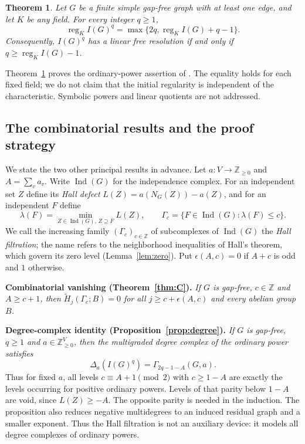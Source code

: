 \documentclass[11pt,a4paper]{article}
\newtheorem{theorem}{Theorem}
\theoremstyle{definition}
\newcommand{\reg}{\operatorname{reg}}
\newcommand{\Ind}{\operatorname{Ind}}
\newcommand{\Ht}{\widetilde H}
\newcommand{\ZZ}{\mathbb Z}
\newcommand{\NN}{\mathbb Z_{\geq 0}}
\begin{document}
\begin{theorem}\label{thm:main}
Let $G$ be a finite simple gap-free graph with at least one edge, and let $K$ be any field. For every integer $q\geq1$,
\begin{equation}\label{eq:main}
 \boxed{\reg_K I(G)^q=\max\{2q,\reg_K I(G)+q-1\}.}
\end{equation}
Consequently, $I(G)^q$ has a linear free resolution if and only if $q\geq \reg_K I(G)-1$.
\end{theorem}
Theorem~\ref{thm:main} proves the ordinary-power assertion of \cite[Conjecture A]{MV}. The equality holds for each fixed field; we do not claim that the initial regularity is independent of the characteristic. Symbolic powers and linear quotients are not addressed.

\subsection{The combinatorial results and the proof strategy}\label{subsec:strategy}
We state the two other principal results in advance. Let $a:V\to\NN$ and $A=\sum_v a_v$. Write $\Ind(G)$ for the independence complex. For an independent set $Z$ define its \emph{Hall defect} $L(Z)=a(N_G(Z))-a(Z)$, and for an independent $F$ define
\[
 \lambda(F)=\min_{Z\in\Ind(G),\,Z\supseteq F}L(Z),\qquad
 \Gamma_c=\{F\in\Ind(G):\lambda(F)\leq c\}.
\]
We call the increasing family $(\Gamma_c)_{c\in\ZZ}$ of subcomplexes of $\Ind(G)$ the \emph{Hall filtration}; the name refers to the neighborhood inequalities of Hall's theorem, which govern its zero level (Lemma~\ref{lem:zero}). Put $\epsilon(A,c)=0$ if $A+c$ is odd and $1$ otherwise.

\medskip\noindent\textbf{Combinatorial vanishing (Theorem~\ref{thm:C}).}
\emph{If $G$ is gap-free, $c\in\ZZ$ and $A\geq c+1$, then $\Ht_j(\Gamma_c;B)=0$ for all $j\geq c+\epsilon(A,c)$ and every abelian group $B$.}

\medskip\noindent\textbf{Degree-complex identity (Proposition~\ref{prop:degree}).}
\emph{If $G$ is gap-free, $q\geq1$ and $a\in\NN^V$, then the multigraded degree complex of the ordinary power satisfies}
\[
 \Delta_a(I(G)^q)=\Gamma_{2q-1-A}(G,a).
\]
Thus for fixed $a$, all levels $c\equiv A+1\pmod2$ with $c\geq1-A$ are exactly the levels occurring for positive ordinary powers. Levels of that parity below $1-A$ are void, since $L(Z)\geq-A$. The opposite parity is needed in the induction. The proposition also reduces negative multidegrees to an induced residual graph and a smaller exponent. Thus the Hall filtration is not an auxiliary device: it models all degree complexes of ordinary powers.
\end{document}
